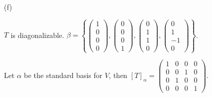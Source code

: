 \begin{Exercise}
\begin{enumerate}[(a)]
\item[(f)]
\begin{answer}
$T$ is diagonalizable. $\beta = \left\{\begin{pmatrix}
1 \\
0 \\
0 \\
0
\end{pmatrix},\begin{pmatrix}
0 \\
0 \\
0 \\
1
\end{pmatrix},\begin{pmatrix}
0 \\
1 \\
1 \\
0
\end{pmatrix},\begin{pmatrix}
0 \\
1 \\
-1 \\
0
\end{pmatrix}\right\}$.
\end{answer}
\begin{solution}
Let $\alpha$ be the standard basis for $V$, then $[T]_{\alpha} = \begin{pmatrix}
1 & 0 & 0 & 0 \\
0 & 0 & 1 & 0 \\
0 & 1 & 0 & 0 \\
0 & 0 & 0 & 1
\end{pmatrix}$.


\end{solution}
\end{enumerate}
\end{Exercise}
